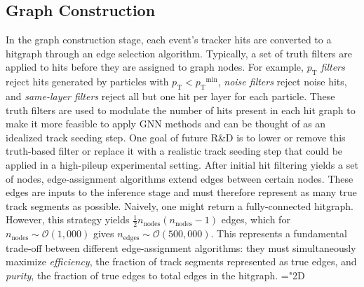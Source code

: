 \documentclass[twocolumn]{svjour3}
\newcommand{\pt}{\ensuremath{p_{\mathrm{T}}}\xspace}
\newcommand{\nnodes}{\ensuremath{n_\mathrm{nodes}\xspace}}
\newcommand{\nedges}{\ensuremath{n_\mathrm{edges}\xspace}}
\begin{document}
\subsection{Graph Construction}
\label{sec:Graph}
In the graph construction stage, each event's tracker hits are converted to a hitgraph through an edge selection algorithm. 
Typically, a set of truth filters are applied to hits before they are assigned to graph nodes. 
For example, \textit{$\pt$ filters} reject hits generated by particles with $\pt<\pt^\mathrm{min}$, \textit{noise filters} reject noise hits, and \textit{same-layer filters} reject all but one hit per layer for each particle. 
These truth filters are used to modulate the number of hits present in each hit graph to make it more feasible to apply GNN methods and can be thought of as an idealized track seeding step.
One goal of future R\&D is to lower or remove this truth-based filter or replace it with a realistic track seeding step that could be applied in a high-pileup experimental setting.
After initial hit filtering yields a set of nodes, edge-assignment algorithms extend edges between certain nodes. 
These edges are inputs to the inference stage and must therefore represent as many true track segments as possible. 
Naively, one might return a fully-connected hitgraph. 
However, this strategy yields $\frac{1}{2}\nnodes(\nnodes-1)$ edges, which for $\nnodes\sim\mathcal{O}(1,000)$ gives $\nedges\sim\mathcal{O}(500,000)$. 
This represents  a fundamental trade-off between different edge-assignment algorithms: they must simultaneously maximize \textit{efficiency}, the fraction of track segments represented as true edges, and \textit{purity}, the fraction of true edges to total edges in the hitgraph.
\mathchardef\mhyphen="2D
\end{document}

